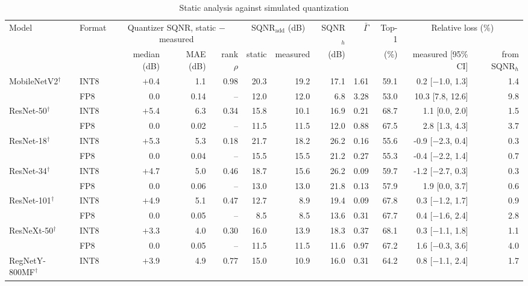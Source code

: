 \begin{table}
\footnotesize\setlength{\tabcolsep}{4pt}
\caption{Static analysis against simulated quantization}\label{tab:staticval}
\begin{tabular}{@{}llrrrrrrrrrr@{}}
\toprule
Model & Format & \multicolumn{3}{c}{Quantizer SQNR, static $-$ measured} & \multicolumn{2}{c}{SQNR$_\text{add}$ (dB)} & SQNR$_h$ & $\bar\Gamma$ & Top-1 & \multicolumn{2}{c}{Relative loss (\%)} \\
\cmidrule{3-5}\cmidrule{6-7}\cmidrule{11-12}
 & & median (dB) & MAE (dB) & rank $\rho$ & static & measured & (dB) & & (\%) & measured [95\% CI] & from SQNR$_h$ \\
\midrule
MobileNetV2$^\dagger$ & INT8 & $+$0.4 & 1.1 & 0.98 & 20.3 & 19.2 & 17.1 & 1.61 & 59.1 & 0.2 [$-$1.0, 1.3] & 1.4 \\
 & FP8 & 0.0 & 0.14 & -- & 12.0 & 12.0 & 6.8 & 3.28 & 53.0 & 10.3 [7.8, 12.6] & 9.8 \\
\midrule
ResNet-50$^\dagger$ & INT8 & $+$5.4 & 6.3 & 0.34 & 15.8 & 10.1 & 16.9 & 0.21 & 68.7 & 1.1 [0.0, 2.0] & 1.5 \\
 & FP8 & 0.0 & 0.02 & -- & 11.5 & 11.5 & 12.0 & 0.88 & 67.5 & 2.8 [1.3, 4.3] & 3.7 \\
\midrule
ResNet-18$^\dagger$ & INT8 & $+$5.3 & 5.3 & 0.18 & 21.7 & 18.2 & 26.2 & 0.16 & 55.6 & -0.9 [$-$2.3, 0.4] & 0.3 \\
 & FP8 & 0.0 & 0.04 & -- & 15.5 & 15.5 & 21.2 & 0.27 & 55.3 & -0.4 [$-$2.2, 1.4] & 0.7 \\
\midrule
ResNet-34$^\dagger$ & INT8 & $+$4.7 & 5.0 & 0.46 & 18.7 & 15.6 & 26.2 & 0.09 & 59.7 & -1.2 [$-$2.7, 0.3] & 0.3 \\
 & FP8 & 0.0 & 0.06 & -- & 13.0 & 13.0 & 21.8 & 0.13 & 57.9 & 1.9 [0.0, 3.7] & 0.6 \\
\midrule
ResNet-101$^\dagger$ & INT8 & $+$4.9 & 5.1 & 0.47 & 12.7 & 8.9 & 19.4 & 0.09 & 67.8 & 0.3 [$-$1.2, 1.7] & 0.9 \\
 & FP8 & 0.0 & 0.05 & -- & 8.5 & 8.5 & 13.6 & 0.31 & 67.7 & 0.4 [$-$1.6, 2.4] & 2.8 \\
\midrule
ResNeXt-50$^\dagger$ & INT8 & $+$3.3 & 4.0 & 0.30 & 16.0 & 13.9 & 18.3 & 0.37 & 68.1 & 0.3 [$-$1.1, 1.8] & 1.1 \\
 & FP8 & 0.0 & 0.05 & -- & 11.5 & 11.5 & 11.6 & 0.97 & 67.2 & 1.6 [$-$0.3, 3.6] & 4.0 \\
\midrule
RegNetY-800MF$^\dagger$ & INT8 & $+$3.9 & 4.9 & 0.77 & 15.0 & 10.9 & 16.0 & 0.31 & 64.2 & 0.8 [$-$1.1, 2.4] & 1.7 \\

\end{tabular}
\end{table}
